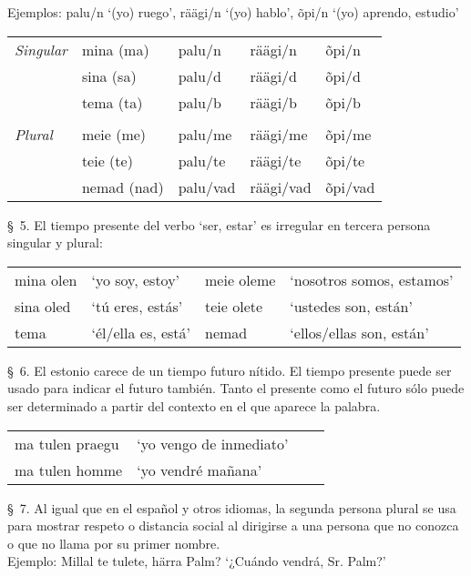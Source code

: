 Ejemplos: palu/n `(yo) ruego', räägi/n `(yo) hablo', õpi/n `(yo) aprendo, estudio'\\

\begin{tabular}{ l l l l l }
	\emph{Singular}	& mina (ma)		& palu/n	& räägi/n	& õpi/n \\
					& sina (sa)		& palu/d	& räägi/d	& õpi/d \\
					& tema (ta)		& palu/b	& räägi/b	& õpi/b \\
					& & & & \\
	\emph{Plural}	& meie (me)		& palu/me	& räägi/me	& õpi/me \\
					& teie (te)		& palu/te	& räägi/te	& õpi/te \\
					& nemad (nad)	& palu/vad	& räägi/vad	& õpi/vad 
\end{tabular}
\bigskip

\S\ 5. El tiempo presente del verbo  `ser, estar' es irregular en tercera persona singular y plural:\\

\begin{tabular}{ l l l l }
	mina olen 			& `yo soy, estoy'		& meie oleme 				& `nosotros somos, estamos' \\
	sina oled 			& `tú eres, estás' 		& teie olete 				& `ustedes son, están' \\
	tema \bemph{on} 	& `él/ella es, está'	& nemad \bemph{on} 		& `ellos/ellas son, están'
\end{tabular}
\bigskip

\S\ 6. El estonio carece de un tiempo futuro nítido. El tiempo presente puede ser usado para indicar el futuro también. Tanto el presente como el futuro sólo puede ser determinado a partir del contexto en el que aparece la palabra.\\

\begin{tabular}{ l l l l }
	ma tulen praegu & `yo vengo de inmediato' \\
	ma tulen homme 	& `yo vendré mañana'
\end{tabular}
\bigskip

\S\ 7. Al igual que en el español y otros idiomas, la segunda persona plural se usa para mostrar respeto o distancia social al dirigirse a una persona que no conozca o que no llama por su primer nombre.\\

Ejemplo: Millal te tulete, härra Palm? `¿Cuándo vendrá, Sr. Palm?'\\

